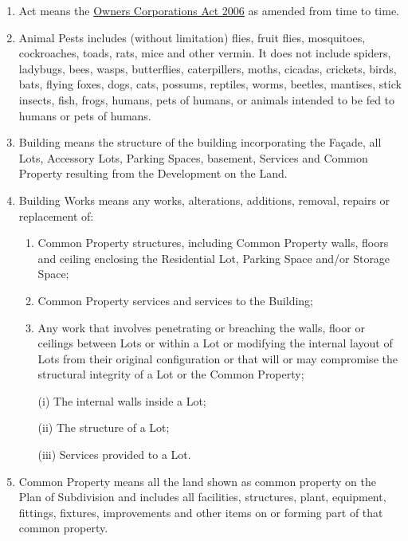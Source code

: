 \documentclass{article}
\begin{document}
\begin{enumerate}[label=\arabic*.]
\begin{enumerate}[label=\arabic{enumi}.\arabic*.]
\begin{enumerate}[label=(\arabic*)]
\item  Act means the \href{https://www.legislation.vic.gov.au/in-force/acts/owners-corporations-act-2006/017}{Owners Corporations Act 2006} as amended from time to time.
\item Animal Pests includes (without limitation) flies, fruit flies, mosquitoes, cockroaches, toads, rats, mice and other vermin. It does not include spiders, ladybugs, bees, wasps, butterflies, caterpillers, moths, cicadas, crickets, birds, bats, flying foxes, dogs, cats, possums, reptiles, worms, beetles, mantises, stick insects, fish, frogs, humans, pets of humans, or animals intended to be fed to humans or pets of humans.

\item  Building means the structure of the building incorporating the Façade, all Lots, Accessory Lots, Parking Spaces, basement, Services and Common Property resulting from the Development on the Land.

\item  Building Works means any works, alterations, additions, removal, repairs or replacement of:

\begin{enumerate}[label=(\alph*)]

\item  Common Property structures, including Common Property walls, floors and ceiling enclosing the Residential Lot, Parking Space and/or Storage Space;

\item  Common Property services and services to the Building;

\item  Any work that involves penetrating or breaching the walls, floor or ceilings between Lots or within a Lot or modifying the internal layout of Lots from their original configuration or that will or may compromise the structural integrity of a Lot or the Common Property;

(i) The internal walls inside a Lot;
\newpage



(ii) The structure of a Lot;

(iii) Services provided to a Lot.

\end{enumerate}

\item  Common Property means all the land shown as common property on the Plan of Subdivision and includes all facilities, structures, plant, equipment, fittings, fixtures, improvements and other items on or forming part of that common property.


\end{enumerate}
\end{enumerate}
\end{enumerate}
\end{document}
